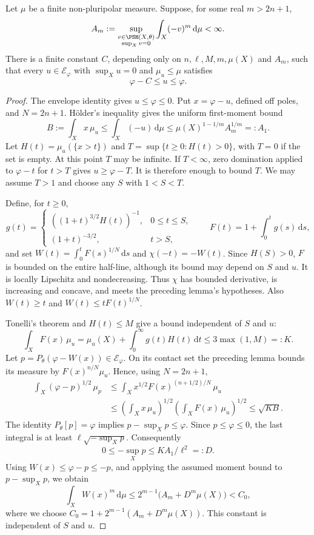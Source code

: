 \begin{proposition}\label{prop:big-model-moment-bound}
Let $\mu$ be a finite non-pluripolar measure. Suppose, for some real $m>2n+1$,
\[
 A_m:=\sup_{\substack{v\in\PSH(X,\theta)\\\sup_Xv=0}}
             \int_X(-v)^m\,\mathrm{d}\mu<\infty.
\]
There is a finite constant $C$, depending only on
$n,\ell,M,m,\mu(X)$ and $A_m$, such that every $u\in\mathcal E_\varphi$ with $\sup_Xu=0$ and $\mu_u\leq\mu$ satisfies
\[
 \varphi-C\leq u\leq\varphi.
\]
\end{proposition}
\begin{proof}
The envelope identity gives $u\leq\varphi\leq0$. Put $x=\varphi-u$, defined off poles, and $N=2n+1$. H\"older's inequality gives the uniform first-moment bound
\[
 B:=\int_Xx\,\mu_u
 \leq\int_X(-u)\,\mathrm{d}\mu
 \leq\mu(X)^{1-1/m}A_m^{1/m}=:A_1.
\]
Let $H(t)=\mu_u(\{x>t\})$ and
$T=\sup\{t\geq0:H(t)>0\}$, with $T=0$ if the set is empty. At this point $T$ may be infinite. If $T<\infty$, zero domination applied to $\varphi-t$ for $t>T$ gives $u\geq\varphi-T$. It is therefore enough to bound $T$. We may assume $T>1$ and choose any $S$ with $1<S<T$.

Define, for $t\geq0$,
\[
 g(t)=
 \begin{cases}
  ((1+t)^{3/2}H(t))^{-1},&0\leq t\leq S,\\
  (1+t)^{-3/2},&t>S,
 \end{cases}
 \qquad F(t)=1+\int_0^t g(s)\,\mathrm{d}s,
\]
and set $W(t)=\int_0^t F(s)^{1/N}\,\mathrm{d}s$ and $\chi(-t)=-W(t)$. Since $H(S)>0$, $F$ is bounded on the entire half-line, although its bound may depend on $S$ and $u$. It is locally Lipschitz and nondecreasing. Thus $\chi$ has bounded derivative, is increasing and concave, and meets the preceding lemma's hypotheses. Also $W(t)\geq t$ and $W(t)\leq tF(t)^{1/N}$.

Tonelli's theorem and $H(t)\leq M$ give a bound independent of $S$ and $u$:
\[
 \int_X F(x)\,\mu_u
 =\mu_u(X)+\int_0^\infty g(t)H(t)\,\mathrm{d}t
 \leq3\max(1,M)=:K.
\]
Let $p=P_\theta(\varphi-W(x))\in\mathcal E_\varphi$. On its contact set the preceding lemma bounds its measure by $F(x)^{n/N}\mu_u$. Hence, using $N=2n+1$,
\[
 \begin{split}
 \int_X(\varphi-p)^{1/2}\,\mu_p
 &\leq\int_X x^{1/2}F(x)^{(n+1/2)/N}\,\mu_u\\
 &\leq\left(\int_Xx\,\mu_u\right)^{1/2}
          \left(\int_XF(x)\,\mu_u\right)^{1/2}
 \leq\sqrt{KB}.
 \end{split}
\]
The identity $P_\theta[p]=\varphi$ implies $p-\sup_Xp\leq\varphi$. Since $p\leq\varphi\leq0$, the last integral is at least $\ell\sqrt{-\sup_Xp}$. Consequently
\[
 0\leq-\sup_Xp\leq KA_1/\ell^2=:D.
\]
Using $W(x)\leq\varphi-p\leq-p$, and applying the assumed moment bound to $p-\sup_Xp$, we obtain
\begin{equation}\label{eq:big-model-weight-moment}
 \int_XW(x)^m\,\mathrm{d}\mu
 \leq2^{m-1}\bigl(A_m+D^m\mu(X)\bigr)<C_0,
\end{equation}
where we choose $C_0=1+2^{m-1}(A_m+D^m\mu(X))$. This constant is independent of $S$ and $u$.


\end{proof}
